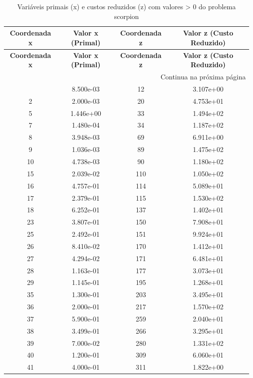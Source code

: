 \documentclass[12pt]{article}
\begin{document}
\begin{longtable}{@{}cccc@{}}
\caption{Variáveis primais (x) e custos reduzidos (z) com valores > 0 do problema scorpion} \\
\toprule
\textbf{Coordenada x} & \textbf{Valor x (Primal)} & \textbf{Coordenada z} & \textbf{Valor z (Custo Reduzido)} \\
\midrule
\endfirsthead

\toprule
\textbf{Coordenada x} & \textbf{Valor x (Primal)} & \textbf{Coordenada z} & \textbf{Valor z (Custo Reduzido)} \\
\midrule
\endhead

\midrule \multicolumn{4}{r}{{Continua na próxima página}} \\ \midrule
\endfoot

\bottomrule
\endlastfoot
1 & 8.500e-03 & 12 & 3.107e+00 \\
2 & 2.000e-03 & 20 & 4.753e+01 \\
5 & 1.446e+00 & 33 & 1.494e+02 \\
7 & 1.480e-04 & 34 & 1.187e+02 \\
8 & 3.948e-03 & 69 & 6.911e+00 \\
9 & 1.036e-03 & 89 & 1.475e+02 \\
10 & 4.738e-03 & 90 & 1.180e+02 \\
15 & 2.039e-02 & 110 & 1.050e+02 \\
16 & 4.757e-01 & 114 & 5.089e+01 \\
17 & 2.379e-01 & 115 & 1.530e+02 \\
18 & 6.252e-01 & 137 & 1.402e+01 \\
23 & 3.807e-01 & 150 & 7.908e+01 \\
25 & 2.492e-01 & 151 & 9.924e+01 \\
26 & 8.410e-02 & 170 & 1.412e+01 \\
27 & 4.294e-02 & 171 & 6.481e+01 \\
28 & 1.163e-01 & 177 & 3.073e+01 \\
29 & 1.145e-01 & 195 & 1.268e+01 \\
35 & 1.300e-01 & 203 & 3.495e+01 \\
36 & 2.000e-01 & 217 & 1.570e+02 \\
37 & 5.900e-01 & 259 & 2.040e+01 \\
38 & 3.499e-01 & 266 & 3.295e+01 \\
39 & 7.000e-02 & 280 & 1.331e+02 \\
40 & 1.200e-01 & 309 & 6.060e+01 \\
41 & 4.000e-01 & 311 & 1.822e+00 \\

\end{longtable}
\end{document}
